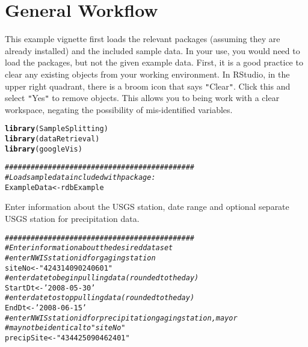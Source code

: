 \documentclass[a4paper,11pt]{article}\usepackage[]{graphicx}\usepackage[]{color}
\makeatletter
\newcommand{\hlstr}[1]{\textcolor[rgb]{0.192,0.494,0.8}{#1}}%
\newcommand{\hlcom}[1]{\textcolor[rgb]{0.678,0.584,0.686}{\textit{#1}}}%
\newcommand{\hlstd}[1]{\textcolor[rgb]{0.345,0.345,0.345}{#1}}%
\newcommand{\hlkwb}[1]{\textcolor[rgb]{0.69,0.353,0.396}{#1}}%
\newcommand{\hlkwd}[1]{\textcolor[rgb]{0.737,0.353,0.396}{\textbf{#1}}}%
\newenvironment{kframe}{%
 \def\at@end@of@kframe{}%
 \ifinner\ifhmode%
  \def\at@end@of@kframe{\end{minipage}}%
  \begin{minipage}{\columnwidth}%
 \fi\fi%
 \def\FrameCommand##1{\hskip\@totalleftmargin \hskip-\fboxsep
 \colorbox{shadecolor}{##1}\hskip-\fboxsep
     \hskip-\linewidth \hskip-\@totalleftmargin \hskip\columnwidth}%
 \MakeFramed {\advance\hsize-\width
   \@totalleftmargin\z@ \linewidth\hsize
   \@setminipage}}%
 {\par\unskip\endMakeFramed%
 \at@end@of@kframe}
\newenvironment{knitrout}{}{} %
\makeatother
\begin{document}
\section{General Workflow}
\label{sec:genWorkflow}

This example vignette first loads the relevant packages (assuming they are already installed) and the included sample data. In your use, you would need to load the packages, but not the given example data.
First, it is a good practice to clear any existing objects from your working environment. In RStudio, in the upper right quadrant, there is a broom icon that says \texttt{"}Clear\texttt{"}. Click this and select \texttt{"}Yes\texttt{"} to remove objects. This allows you to being work with a clear workspace, negating the possibility of mis-identified variables. 

\begin{knitrout}
\color{fgcolor}\begin{kframe}
\begin{alltt}
\hlkwd{library}\hlstd{(SampleSplitting)}
\hlkwd{library}\hlstd{(dataRetrieval)}
\hlkwd{library}\hlstd{(googleVis)}

\hlcom{############################################}
\hlcom{# Load sample data included with package:}
\hlstd{ExampleData} \hlkwb{<-} \hlstd{rdbExample}
\end{alltt}
\end{kframe}
\end{knitrout}


Enter information about the USGS station, date range and optional separate USGS station for precipitation data.

\begin{knitrout}
\color{fgcolor}\begin{kframe}
\begin{alltt}
\hlcom{############################################}
\hlcom{# Enter information about the desired data set}
\hlcom{# enter NWIS station id for gaging station}
\hlstd{siteNo} \hlkwb{<-} \hlstr{"424314090240601"}
\hlcom{# enter date to begin pulling data (rounded to the day)}
\hlstd{StartDt} \hlkwb{<-} \hlstr{'2008-05-30'}
\hlcom{# enter date to stop pulling data (rounded to the day)}
\hlstd{EndDt} \hlkwb{<-} \hlstr{'2008-06-15'}
\hlcom{# enter NWIS station id for precipitation gaging station, may or }
\hlcom{# may not be identical to "siteNo"}
\hlstd{precipSite} \hlkwb{<-} \hlstr{"434425090462401"}
\end{alltt}
\end{kframe}
\end{knitrout}
\end{document}
